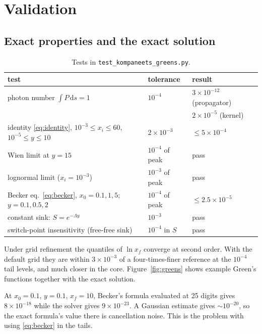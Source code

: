 \documentclass[11pt]{article}
\newcommand{\dd}{\mathrm{d}}
\begin{document}
\section{Validation}\label{sec:validation}

\subsection{Exact properties and the exact solution}

\begin{table}[h]
\centering
\small
\begin{tabular}{p{}ll}
\toprule
test & tolerance & result \\
\midrule
photon number $\int P\,\dd s=1$ & $10^{-4}$ & $3\times10^{-12}$ (propagator)\\
 & & $2\times10^{-5}$ (kernel)\\
identity \eqref{eq:identity}, $10^{-3}\le x_i\le60$, $10^{-5}\le y\le10$ & $2\times10^{-3}$ & $\le 5\times10^{-4}$\\
Wien limit at $y=15$ & $10^{-4}$ of peak & pass\\
lognormal limit ($x_i=10^{-3}$) & $10^{-3}$ of peak & pass\\
Becker eq.~\eqref{eq:becker}, $x_0=0.1,1,5$; $y=0.1,0.5,2$ & $10^{-4}$ of peak & $\le2.5\times10^{-5}$\\
constant sink: $S=e^{-\Lambda y}$ & $10^{-3}$ & pass\\
switch-point insensitivity (free-free sink) & $10^{-4}$ in $S$ & pass\\
\bottomrule
\end{tabular}
\caption{Tests in \texttt{test\_kompaneets\_greens.py}.}
\end{table}

Under grid refinement the quantiles of $\ln x_f$ converge at second order.
With the default grid they are within $3\times10^{-3}$ of a four-times-finer
reference at the $10^{-4}$ tail levels, and much closer in the core.
Figure~\ref{fig:greens} shows example Green's functions together with the
exact solution.

At $x_0=0.1$, $y=0.1$, $x_f=10$, Becker's formula evaluated at 25 digits
gives $8\times10^{-18}$ while the solver gives $9\times10^{-23}$. A Gaussian
estimate gives $\sim10^{-20}$, so the exact formula's value there is
cancellation noise. This is the problem with using \eqref{eq:becker} in the
tails.
\end{document}
